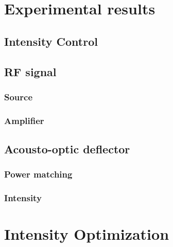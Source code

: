 \chapter{Experimental results}




\section{Intensity Control}

\section{RF signal}
\subsection{Source}
\subsection{Amplifier}

\section{Acousto-optic deflector}
\subsection{Power matching}

\subsection{Intensity}


\chapter{Intensity Optimization}
\
